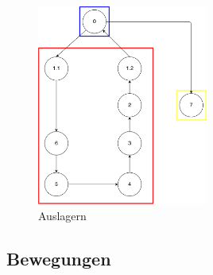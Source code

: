 \begin{figure}[h]
  \begin{center}
    \includegraphics[width=0.5\textwidth]{images/auslagern.png}
    \caption{Auslagern}
    \label{fig:out}
  \end{center}
\end{figure}
%
\subsection{Bewegungen}





